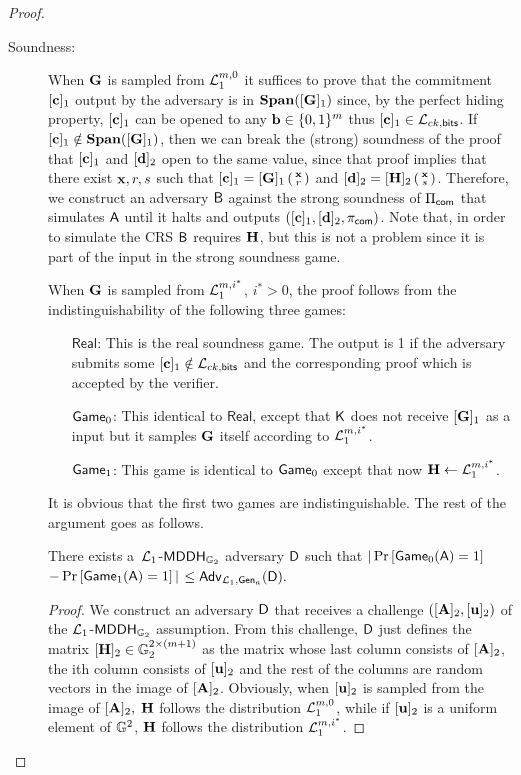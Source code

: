 \begin{proof}
\begin{description}
\item[Soundness:] When $\mathbf{{G}}$ is sampled from $\mathcal{L}_1^{m,0}$ it suffices to prove that the commitment $[\mathbf{c}]_1$ output by the adversary is in $\mathbf{Span}([\mathbf{{G}}]_1)$ since, by the perfect hiding property, $[\mathbf{c}]_1$ can be opened to any $\mathbf{b}\in\{0,1\}^m$ thus $[\mathbf{c}]_1\in\mathcal{L}_{ck,\mathsf{bits}}$. If $[\mathbf{c}]_1\notin\mathbf{Span}([\mathbf{{G}}]_1)$, then we can break the (strong) soundness of the proof that $[\mathbf{c}]_1$ and $[\mathbf{d}]_2$ open to the same value, since that proof implies that there exist $\mathbf{x},r,s$ such that $[\mathbf{c}]_1=[\mathbf{{G}}]_1\left(\begin{smallmatrix}\mathbf{x}\\r\end{smallmatrix}\right)$ and $[\mathbf{d}]_2=[\mathbf{{H}}]_2\left(\begin{smallmatrix}\mathbf{x}\\s\end{smallmatrix}\right)$. Therefore, we construct an adversary $\mathsf{B}$ against the strong soundness of $\Pi_{\mathsf{com}}$ that simulates $\mathsf{A}$ until it halts and outputs $([\mathbf{c}]_1,[\mathbf{d}]_2,\pi_{\mathsf{com}})$. Note that, in order to simulate the CRS $\mathsf{B}$ requires $\mathbf{{H}}$, but this is not a problem since it is part of the input in the strong soundness game.
 
When $\mathbf{{G}}$ is sampled from $\mathcal{L}_1^{m,i^*}$, ${i^*}>0$, the proof follows from the indistinguishability of the following three games:
\begin{itemize}
\item[$\mathsf{Real}$:] This is the real soundness game. The output is 1 if the adversary submits some $[\mathbf{c}]_1\notin\mathcal{L}_{ck,\mathsf{bits}}$ and the corresponding proof which is accepted by the verifier.
\item[$\mathsf{Game}_0$:] This identical to $\mathsf{Real}$, except that $\mathsf{K}$ does not receive $[\mathbf{{G}}]_1$ as a input but
it samples $\mathbf{{G}}$ itself according to $\mathcal{L}_1^{m,i^*}$.
\item[$\mathsf{Game}_1$:] This game is identical to $\mathsf{Game}_0$ except that now $\mathbf{{H}}\gets\mathcal{L}_1^{m,i^*}$.
\end{itemize}

It is obvious that the first two games are indistinguishable. The rest of the argument goes as follows.

\begin{lemma} There exists a\ $\mathcal{L}_1$-$\mathsf{MDDH}_{\mathbb{G}_2}$ adversary $\mathsf{D}$ such that
$|\Pr\left[\mathsf{Game}_{0}(\mathsf{A})=1\right]$ $-\Pr\left[\mathsf{Game}_{1}(\mathsf{A})=1\right]|$ $\leq \mathsf{Adv}_{\mathcal{L}_1,\mathsf{Gen}_a}(\mathsf{D}).$
\end{lemma}
\begin{proof}
We construct an adversary $\mathsf{D}$ that receives 
a challenge $([\mathbf{{A}}]_2,[\mathbf{u}]_2)$ of the 
$\mathcal{L}_1$-$\mathsf{MDDH}_{\mathbb{G}_2}$ assumption. From this challenge, $\mathsf{D}$ just defines the matrix  $[\mathbf{{H}}]_2\in\mathbb{G}_2^{2\times(m+1)}$ as the matrix whose last column consists of $[\mathbf{{A}}]_2$, the ith column consists of $[\mathbf{u}]_2$ and the rest of the columns are random vectors in the image of $[\mathbf{{A}}]_2$. 
Obviously, when $[\mathbf{u}]_2$ is sampled from 
the image of $[\mathbf{{A}}]_2,$ $\mathbf{{H}}$ follows the distribution $\mathcal{L}_1^{m,0}$, while if $[\mathbf{u}]_2$ is a uniform element of $\mathbb{G}^2$, $\mathbf{{H}}$ follows the distribution $\mathcal{L}_1^{m,i^*}$. 
 

\end{proof}
\end{description}
\end{proof}
